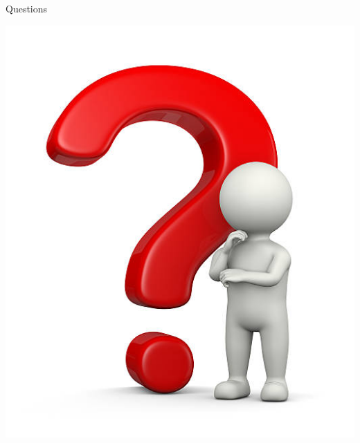 \documentclass[aspectratio=169]{beamer}
\begin{document}
\note{
}

\begin{frame}{Questions}
  \begin{center}
    \includegraphics[height=0.9\textheight]{./img/question.jpg}
  \end{center}
\end{frame}
\end{document}
